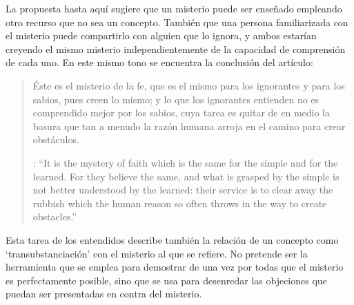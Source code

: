 La propuesta hasta aquí sugiere que un misterio puede ser enseñado empleando otro recurso que no sea un concepto. También que una persona familiarizada con el misterio puede compartirlo con alguien que lo ignora, y ambos estarían creyendo el mismo misterio independientemente de la capacidad de comprensión de cada uno. En este mismo tono se encuentra la conclusión del artículo: \blockquote[{\cite[112]{anscombe1981erp:ot}}: \enquote{It is the mystery of faith which is the same for the simple and for the learned. For they believe the same, and what is grasped by the simple is not better understood by the learned: their service is to clear away the rubbish which the human reason so often throws in the way to create obstacles.}]{Éste es el misterio de la fe, que es el mismo para los ignorantes y para los sabios, pues creen lo mismo; y lo que los ignorantes entienden no es comprendido mejor por los sabios, cuya tarea es quitar de en medio la basura que tan a menudo la razón humana arroja en el camino para crear obstáculos.} Esta tarea de los entendidos describe también la relación de un concepto como `transubstanciación' con el misterio al que se refiere. No pretende ser la herramienta que se emplea para demostrar de una vez por todas que el misterio es perfectamente posible, sino que se usa para desenredar las objeciones que puedan ser presentadas en contra del misterio.

